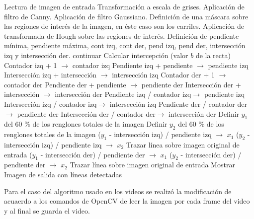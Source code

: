 \documentclass[10pt]{IEEEtran}
\begin{document}
\begin{algorithmic}[1]
\State Lectura de imagen de entrada
\State Transformación a escala de grises.
\State Aplicación de filtro de Canny.
\State Aplicación de filtro Gaussiano.
\State Definición de una máscara sobre las regiones de interés de la imagen, en éste caso son los carriles.
\State Aplicación de transformada de Hough sobre las regiones de interés.
\State Definición de pendiente mínima, pendiente máxima, cont izq, cont der, pend izq, pend der, intersección izq y intersección der.	
		\State continuar
		\State Calcular intercepción (valor $b$ de la recta)
				\State  Contador izq + 1 $\rightarrow$  contador izq
				\State Pendiente izq + pendiente $\rightarrow$ pendiente izq 
				\State Intersección izq + intersección $\rightarrow$  intersección izq
			\Else
				\State Contador der + 1 $\rightarrow$  contador der
				\State Pendiente der + pendiente $\rightarrow$ pendiente der
				\State Intersección der + intersección $\rightarrow$ intersección der
			\EndIf
	\EndIf
\EndFor
\State Pendiente izq / contador izq$\rightarrow$ pendiente izq
\State Intersección izq / contador izq$\rightarrow$ intersección izq
\State Pendiente der / contador der$\rightarrow$ pendiente der
\State Intersección der / contador der$\rightarrow$ intersección der
\State Definir $y_{1}$ del 60 $\%$ de los renglones totales de la imagen
\State Definir $y_{2}$ del 60 $\%$ de los renglones totales de la imagen
\State ($y_{1}$ - intersección izq) / pendiente izq $\rightarrow$ $x_{1}$
\State ($y_{2}$ - intersección izq) / pendiente izq $\rightarrow$ $x_{2}$
\State Trazar línea sobre imagen original de entrada
\State ($y_{1}$ - intersección der) / pendiente der $\rightarrow$ $x_{1}$
\State ($y_{2}$ - intersección der) / pendiente der $\rightarrow$ $x_{2}$
\State Trazar línea sobre imagen original de entrada
\State Mostrar Imagen de salida con líneas detectadas
\end{algorithmic}

Para el caso del algoritmo usado en los videos se realizó la modificación de acuaerdo a los comandos de OpenCV \cite{opencvvideo} de leer la imagen por cada frame del video y al final se guarda el video.
\end{document}
